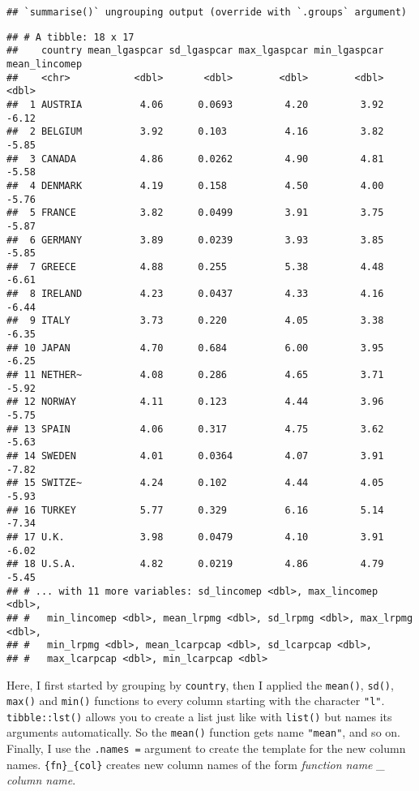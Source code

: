 \documentclass[
]{article}
\begin{document}
\begin{verbatim}
## `summarise()` ungrouping output (override with `.groups` argument)
\end{verbatim}

\begin{verbatim}
## # A tibble: 18 x 17
##    country mean_lgaspcar sd_lgaspcar max_lgaspcar min_lgaspcar mean_lincomep
##    <chr>           <dbl>       <dbl>        <dbl>        <dbl>         <dbl>
##  1 AUSTRIA          4.06      0.0693         4.20         3.92         -6.12
##  2 BELGIUM          3.92      0.103          4.16         3.82         -5.85
##  3 CANADA           4.86      0.0262         4.90         4.81         -5.58
##  4 DENMARK          4.19      0.158          4.50         4.00         -5.76
##  5 FRANCE           3.82      0.0499         3.91         3.75         -5.87
##  6 GERMANY          3.89      0.0239         3.93         3.85         -5.85
##  7 GREECE           4.88      0.255          5.38         4.48         -6.61
##  8 IRELAND          4.23      0.0437         4.33         4.16         -6.44
##  9 ITALY            3.73      0.220          4.05         3.38         -6.35
## 10 JAPAN            4.70      0.684          6.00         3.95         -6.25
## 11 NETHER~          4.08      0.286          4.65         3.71         -5.92
## 12 NORWAY           4.11      0.123          4.44         3.96         -5.75
## 13 SPAIN            4.06      0.317          4.75         3.62         -5.63
## 14 SWEDEN           4.01      0.0364         4.07         3.91         -7.82
## 15 SWITZE~          4.24      0.102          4.44         4.05         -5.93
## 16 TURKEY           5.77      0.329          6.16         5.14         -7.34
## 17 U.K.             3.98      0.0479         4.10         3.91         -6.02
## 18 U.S.A.           4.82      0.0219         4.86         4.79         -5.45
## # ... with 11 more variables: sd_lincomep <dbl>, max_lincomep <dbl>,
## #   min_lincomep <dbl>, mean_lrpmg <dbl>, sd_lrpmg <dbl>, max_lrpmg <dbl>,
## #   min_lrpmg <dbl>, mean_lcarpcap <dbl>, sd_lcarpcap <dbl>,
## #   max_lcarpcap <dbl>, min_lcarpcap <dbl>
\end{verbatim}

Here, I first started by grouping by \texttt{country}, then I applied the \texttt{mean()}, \texttt{sd()}, \texttt{max()} and
\texttt{min()} functions to every column starting with the character \texttt{"l"}. \texttt{tibble::lst()} allows you to
create a list just like with \texttt{list()} but names its arguments automatically. So the \texttt{mean()} function
gets name \texttt{"mean"}, and so on. Finally, I use the \texttt{.names\ =} argument to create the template for
the new column names. \texttt{\{fn\}\_\{col\}} creates new column names of the form \emph{function name \_ column name}.
\end{document}
